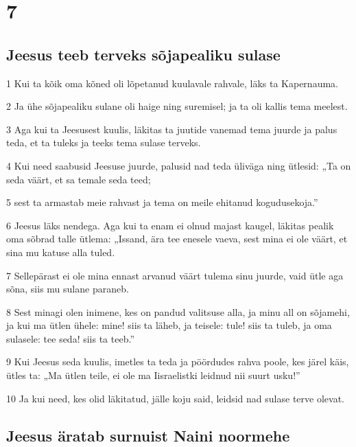 \chapter{7}

\section*{Jeesus teeb terveks sõjapealiku sulase}

\par 1 Kui ta kõik oma kõned oli lõpetanud kuulavale rahvale, läks ta Kapernauma.
\par 2 Ja ühe sõjapealiku sulane oli haige ning suremisel; ja ta oli kallis tema meelest.
\par 3 Aga kui ta Jeesusest kuulis, läkitas ta juutide vanemad tema juurde ja palus teda, et ta tuleks ja teeks tema sulase terveks.
\par 4 Kui need saabusid Jeesuse juurde, palusid nad teda üliväga ning ütlesid: „Ta on seda väärt, et sa temale seda teed;
\par 5 sest ta armastab meie rahvast ja tema on meile ehitanud kogudusekoja.”
\par 6 Jeesus läks nendega. Aga kui ta enam ei olnud majast kaugel, läkitas pealik oma sõbrad talle ütlema: „Issand, ära tee enesele vaeva, sest mina ei ole väärt, et sina mu katuse alla tuled.
\par 7 Sellepärast ei ole mina ennast arvanud väärt tulema sinu juurde, vaid ütle aga sõna, siis mu sulane paraneb.
\par 8 Sest minagi olen inimene, kes on pandud valitsuse alla, ja minu all on sõjamehi, ja kui ma ütlen ühele: mine! siis ta läheb, ja teisele: tule! siis ta tuleb, ja oma sulasele: tee seda! siis ta teeb.”
\par 9 Kui Jeesus seda kuulis, imetles ta teda ja pöördudes rahva poole, kes järel käis, ütles ta: „Ma ütlen teile, ei ole ma Iisraelistki leidnud nii suurt usku!”
\par 10 Ja kui need, kes olid läkitatud, jälle koju said, leidsid nad sulase terve olevat.

\section*{Jeesus äratab surnuist Naini noormehe}

